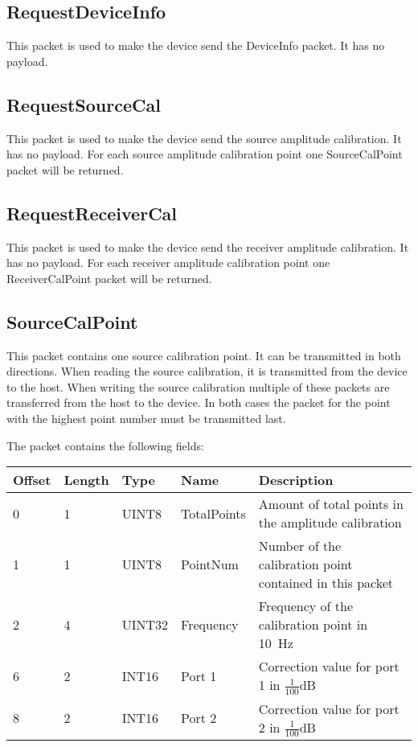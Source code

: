 \documentclass[a4paper,11pt]{article}
\begin{document}
\subsection{RequestDeviceInfo}
This packet is used to make the device send the DeviceInfo packet. It has no payload.

\subsection{RequestSourceCal}
This packet is used to make the device send the source amplitude calibration. It has no payload. For each source amplitude calibration point one SourceCalPoint packet will be returned.

\subsection{RequestReceiverCal}
This packet is used to make the device send the receiver amplitude calibration. It has no payload. For each receiver amplitude calibration point one ReceiverCalPoint packet will be returned.

\subsection{SourceCalPoint}
This packet contains one source calibration point. It can be transmitted in both directions. When reading the source calibration, it is transmitted from the device to the host. When writing the source calibration multiple of these packets are transferred from the host to the device. In both cases the packet for the point with the highest point number must be transmitted last.

The packet contains the following fields:
\begin{ThreePartTable}
\setlength\tabcolsep{3pt}

\begin{longtable}{p{} |  p{}  |  p{}| p{} | p{}}
\toprule
\textbf{Offset} &\textbf{Length} &\textbf{Type} & \textbf{Name} &\textbf{Description} \\ 
\hline
\endhead
\midrule[\heavyrulewidth]
\endfoot  
\midrule[\heavyrulewidth]
\endlastfoot

0 & 1 & UINT8 & TotalPoints & Amount of total points in the amplitude calibration \\
1 & 1 & UINT8 & PointNum & Number of the calibration point contained in this packet \\
2 & 4 & UINT32 & Frequency & Frequency of the calibration point in \SI{10}{\hertz} \\
6 & 2 & INT16 & Port 1 & Correction value for port 1 in $\frac{1}{100}$dB \\
8 & 2 & INT16 & Port 2 & Correction value for port 2 in $\frac{1}{100}$dB \\
\end{longtable}   
\end{ThreePartTable}
\end{document}
